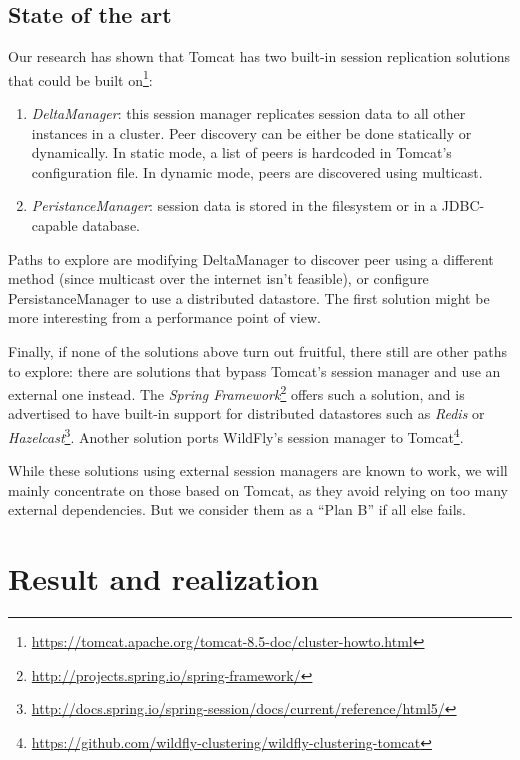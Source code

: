 \documentclass[11pt,a4paper]{article}
\begin{document}
\subsection{State of the art}

Our research has shown that Tomcat has two built-in session replication
solutions that could be built
on\footnote{\url{https://tomcat.apache.org/tomcat-8.5-doc/cluster-howto.html}}:

\begin{enumerate}
    \item \emph{DeltaManager}: this session manager replicates session data to
        all other instances in a cluster. Peer discovery can be either be done
        statically or dynamically. In static mode, a list of peers is hardcoded
        in Tomcat's configuration file. In dynamic mode, peers are discovered
        using multicast.

    \item \emph{PeristanceManager}: session data is stored in the filesystem or
        in a JDBC-capable database.
\end{enumerate}

Paths to explore are modifying DeltaManager to discover peer using a different
method (since multicast over the internet isn't feasible), or configure
PersistanceManager to use a distributed datastore. The first solution might be
more interesting from a performance point of view.

Finally, if none of the solutions above turn out fruitful, there still are
other paths to explore: there are solutions that bypass Tomcat's session
manager and use an external one instead. The \emph{Spring
    Framework}\footnote{\url{http://projects.spring.io/spring-framework/}} offers
such a solution, and is advertised to have built-in support for distributed
datastores such as \emph{Redis} or
\emph{Hazelcast}\footnote{\url{http://docs.spring.io/spring-session/docs/current/reference/html5/}}.
Another solution ports WildFly's session manager to
Tomcat\footnote{\url{https://github.com/wildfly-clustering/wildfly-clustering-tomcat}}.

While these solutions using external session managers are known to work, we
will mainly concentrate on those based on Tomcat, as they avoid relying on too
many external dependencies. But we consider them as a ``Plan B'' if all else
fails.


\section{Result and realization}
\end{document}
